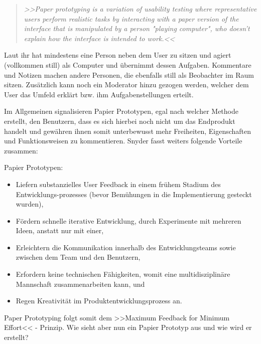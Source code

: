 \begin{quote}
	\textsl{>>Paper prototyping is a variation of usability testing where representative users perform realistic tasks by interacting with a paper version of the interface that is manipulated by a person "playing computer", who doesn't explain how the interface is intended to work.<<}
\begin{flushright}\citep{Snyder:2003}\end{flushright}
\end{quote}

Laut ihr hat mindestens eine Person neben dem User zu sitzen und agiert (vollkommen still) als Computer und übernimmt dessen Aufgaben. Kommentare und Notizen machen andere Personen, die ebenfalls still als Beobachter im Raum sitzen. Zusätzlich kann noch ein Moderator hinzu gezogen werden, welcher dem User das Umfeld erklärt bzw. ihm Aufgabenstellungen erteilt.

\medskip Im Allgemeinen signalisieren Papier Prototypen, egal nach welcher Methode erstellt, den Benutzern, dass es sich hierbei noch nicht um das Endprodukt handelt und gewähren ihnen somit unterbewusst mehr Freiheiten, Eigenschaften und Funktionsweisen zu kommentieren. Snyder fasst weiters folgende Vorteile zusammen:

\medskip Papier Prototypen:
\begin{itemize}
	\item Liefern substanzielles User Feedback in einem frühem Stadium des Entwicklungs-prozesses (bevor Bemühungen in die Implementierung gesteckt wurden),
	\item Fördern schnelle iterative Entwicklung, durch Experimente mit mehreren Ideen, anstatt nur mit einer,
	\item Erleichtern die Kommunikation innerhalb des Entwicklungsteams sowie zwischen dem Team und den Benutzern,
	\item Erfordern keine technischen Fähigkeiten, womit eine multidisziplinäre Mannschaft zusammenarbeiten kann, und
	\item Regen Kreativität im Produktentwicklungsprozess an.
\end{itemize}
\begin{flushright}\citep{Snyder:2003}\end{flushright}
	
Paper Prototyping folgt somit dem >>Maximum Feedback for Minimum Effort<< - Prinzip. Wie sieht aber nun ein Papier Prototyp aus und wie wird er erstellt?

